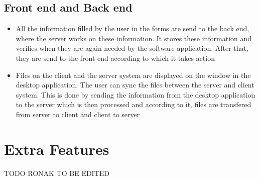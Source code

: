 \documentclass{article}
\begin{document}
		\subsection{Front end and Back end}
			\begin{itemize}
				\item All the information filled by the user in the forms are send to the back end, where the server works on these information. It stores these information and verifies when they are again needed by the software application. After that, they are send to the front end according to which it takes action
				\item Files on the client and the server system are displayed on the window in the desktop application. The user can sync the files between the server and client system. This is done by sending the information from the desktop application to the server which is then processed and according to it, files are transfered from server to client and client to server
			\end{itemize}
	\section{Extra Features}
		TODO RONAK
		TO BE EDITED
\end{document}

